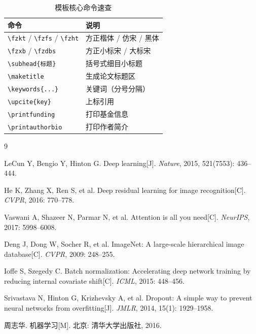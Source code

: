 \documentclass{harryopo-paper}
\begin{document}
\begin{table}[htbp]
\centering
\begin{tabular}{lp{7cm}}
\toprule
\textbf{命令} & \textbf{说明} \\
\midrule
\verb|\fzkt| / \verb|\fzfs| / \verb|\fzht| & 方正楷体 / 仿宋 / 黑体 \\
\verb|\fzxb| / \verb|\fzdbs| & 方正小标宋 / 大标宋 \\
\verb|\subhead{标题}| & 括号式细目小标题 \\
\verb|\maketitle| & 生成论文标题区 \\
\verb|\keywords{...}| & 关键词（分号分隔） \\
\verb|\upcite{key}| & 上标引用 \\
\verb|\printfunding| & 打印基金信息 \\
\verb|\printauthorbio| & 打印作者简介 \\
\bottomrule
\end{tabular}
\caption{模板核心命令速查}
\label{tab:commands}
\end{table}

\printfunding

\begin{thebibliography}{9}

 LeCun Y, Bengio Y, Hinton G. Deep learning[J]. \emph{Nature}, 2015, 521(7553): 436--444.

 He K, Zhang X, Ren S, et al. Deep residual learning for image recognition[C]. \emph{CVPR}, 2016: 770--778.

 Vaswani A, Shazeer N, Parmar N, et al. Attention is all you need[C]. \emph{NeurIPS}, 2017: 5998--6008.

 Deng J, Dong W, Socher R, et al. ImageNet: A large-scale hierarchical image database[C]. \emph{CVPR}, 2009: 248--255.

 Ioffe S, Szegedy C. Batch normalization: Accelerating deep network training by reducing internal covariate shift[C]. \emph{ICML}, 2015: 448--456.

 Srivastava N, Hinton G, Krizhevsky A, et al. Dropout: A simple way to prevent neural networks from overfitting[J]. \emph{JMLR}, 2014, 15(1): 1929--1958.

 周志华. 机器学习[M]. 北京: 清华大学出版社, 2016.

\end{thebibliography}
\end{document}
